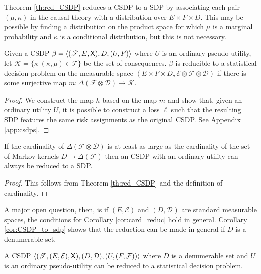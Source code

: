 Theorem \ref{th:red_CSDP} reduces a CSDP to a SDP by associating each pair $(\mu,\kappa)$ in the causal theory with a distribution over $E\times F\times D$. This may be possible by finding a distribution on the product space for which $\mu$ is a marginal probability and $\kappa$ is a conditional distribution, but this is not necessary.

\begin{theorem}\label{th:red_CSDP}
Given a CSDP $\beta=\langle (\mathscr{T},E,\mathsf{X}),D,(U,F)\rangle$ where $U$ is an ordinary pseudo-utility, let $\mathscr{K}=\{\kappa|(\kappa,\mu)\in \mathscr{T}\}$ be the set of consequences. $\beta$ is reducible to a statistical decision problem on the measurable space $(E\times F\times D,\mathcal{E}\otimes \mathcal{F}\otimes \mathcal{D})$ if there is some surjective map $m:\Delta(\mathcal{F}\otimes\mathcal{D})\to \mathscr{K}$.
\end{theorem}

\begin{proof}
We construct the map $h$ based on the map $m$ and show that, given an ordinary utility $U$, it is possible to construct a loss $\ell$ such that the resulting SDP features the same risk assignments as the original CSDP. See Appendix \ref{app:csdps}.
\end{proof}

\begin{corollary}\label{cor:card_reduc}
If the cardinality of $\Delta(\mathcal{F}\otimes\mathcal{D})$ is at least as large as the cardinality of the set of Markov kernels $D\to \Delta(\mathcal{F})$ then an CSDP with an ordinary utility can always be reduced to a SDP.
\end{corollary}

\begin{proof}
This follows from Theorem \ref{th:red_CSDP} and the definition of cardinality.
\end{proof}

A major open question, then, is if $(E,\mathcal{E})$ and $(D,\mathcal{D})$ are standard measurable spaces, the conditions for Corollary \ref{cor:card_reduc} hold in general. Corollary \ref{cor:CSDP_to_sdp} shows that the reduction can be made in general if $D$ is a denumerable set.

\begin{corollary}\label{cor:CSDP_to_sdp}
A CSDP $\langle (\mathscr{T},(E,\mathcal{E}),\mathsf{X}),(D,\mathcal{D}),(U,(F,\mathcal{F}))\rangle$ where $D$ is a denumerable set and $U$ is an ordinary pseudo-utility can be reduced to a statistical decision problem.
\end{corollary}

